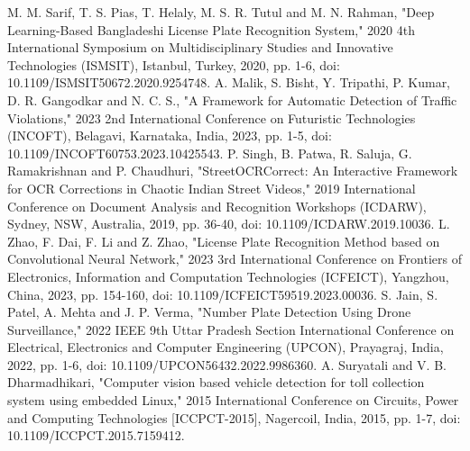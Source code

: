 \documentclass[conference]{IEEEtran}
\begin{document}
\begin{thebibliography}{00}
 M. M. Sarif, T. S. Pias, T. Helaly, M. S. R. Tutul and M. N. Rahman, "Deep Learning-Based Bangladeshi License Plate Recognition System," 2020 4th International Symposium on Multidisciplinary Studies and Innovative Technologies (ISMSIT), Istanbul, Turkey, 2020, pp. 1-6, doi: 10.1109/ISMSIT50672.2020.9254748.
 A. Malik, S. Bisht, Y. Tripathi, P. Kumar, D. R. Gangodkar and N. C. S., "A Framework for Automatic Detection of Traffic Violations," 2023 2nd International Conference on Futuristic Technologies (INCOFT), Belagavi, Karnataka, India, 2023, pp. 1-5, doi: 10.1109/INCOFT60753.2023.10425543.
 P. Singh, B. Patwa, R. Saluja, G. Ramakrishnan and P. Chaudhuri, "StreetOCRCorrect: An Interactive Framework for OCR Corrections in Chaotic Indian Street Videos," 2019 International Conference on Document Analysis and Recognition Workshops (ICDARW), Sydney, NSW, Australia, 2019, pp. 36-40, doi: 10.1109/ICDARW.2019.10036.
 L. Zhao, F. Dai, F. Li and Z. Zhao, "License Plate Recognition Method based on Convolutional Neural Network," 2023 3rd International Conference on Frontiers of Electronics, Information and Computation Technologies (ICFEICT), Yangzhou, China, 2023, pp. 154-160, doi: 10.1109/ICFEICT59519.2023.00036.
 S. Jain, S. Patel, A. Mehta and J. P. Verma, "Number Plate Detection Using Drone Surveillance," 2022 IEEE 9th Uttar Pradesh Section International Conference on Electrical, Electronics and Computer Engineering (UPCON), Prayagraj, India, 2022, pp. 1-6, doi: 10.1109/UPCON56432.2022.9986360.
 A. Suryatali and V. B. Dharmadhikari, "Computer vision based vehicle detection for toll collection system using embedded Linux," 2015 International Conference on Circuits, Power and Computing Technologies [ICCPCT-2015], Nagercoil, India, 2015, pp. 1-7, doi: 10.1109/ICCPCT.2015.7159412.




\end{thebibliography}
\end{document}
